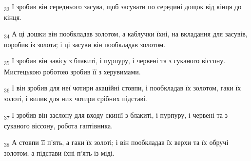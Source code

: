 \begin{tcolorbox}
\textsubscript{33} І зробив він середнього засува, щоб засувати по середині дощок від кінця до кінця.
\end{tcolorbox}
\begin{tcolorbox}
\textsubscript{34} А ці дошки він пообкладав золотом, а каблучки їхні, на вкладання для засувів, поробив із золота; і ці засуви він пообкладав золотом.
\end{tcolorbox}
\begin{tcolorbox}
\textsubscript{35} І зробив він завісу з блакиті, і пурпуру, і червені та з суканого віссону. Мистецькою роботою зробив її з херувимами.
\end{tcolorbox}
\begin{tcolorbox}
\textsubscript{36} І він зробив для неї чотири акаційні стовпи, і пообкладав їх золотом, гаки їх золоті, і вилив для них чотири срібних підставі.
\end{tcolorbox}
\begin{tcolorbox}
\textsubscript{37} І зробив він заслону для входу скинії з блакиті, і пурпуру, і червені та з суканого віссону, робота гаптівника.
\end{tcolorbox}
\begin{tcolorbox}
\textsubscript{38} А стовпи її п'ять, а гаки їх золоті; і він пообкладав їх верхи та їх обручі золотом; а підстави їхні п'ять із міді.
\end{tcolorbox}
